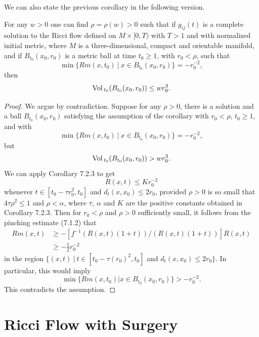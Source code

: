 We can also state the previous corollary in the following version.

\begin{corollary}
  \label{cor:cz-small-ball-pseudolocal-curvature-control}

For any $w>0$ one can find $\rho = \rho(w)>0$ such that if
$g_{ij}(t)$ is a complete solution to the Ricci flow defined on
$M\times[0,T)$ with $T>1$ and with normalized initial metric,
where $M$ is a three-dimensional, compact and orientable manifold,
and if $B_{t_0}(x_0,r_0)$ is a metric ball at time $t_0\geq1$,
with $r_0<\rho$, such that$$\min\{ Rm(x,t_0)\ |\ x\in
B_{t_0}(x_0,r_0)\}=-r_0^{-2},$$ then
$$
{\rm Vol}\,_{t_0}(B_{t_0}(x_0,r_0))\leq wr_0^3.
$$
\end{corollary}

\begin{proof}
We argue by contradiction. Suppose for any $\rho>0$, there is a
solution and a ball $B_{t_0}(x_0,r_0)$ satisfying the assumption
of the corollary with $r_0<\rho$, $t_0\geq1$, and with
$$
\min\{ Rm(x,t_0)\ |\ x\in B_{t_0}(x_0,r_0)\}=-r_0^{-2},
$$
but
$$
{\rm Vol}\,_{t_0}(B_{t_0}(x_0,r_0))>wr_0^3.
$$
We can apply Corollary 7.2.3 to get
$$
R(x,t)\leq Kr_0^{-2}
$$
whenever $t\in[t_0-\tau r_0^2,t_0]$ and $d_t(x,x_0)\leq2r_0$,
provided $\rho>0$ is so small that $4\tau\rho^2\leq1$ and
$\rho<\alpha$, where $\tau,\ \alpha$ and $K$ are the positive
constants obtained in Corollary 7.2.3. Then for $r_0<\rho$ and
$\rho>0$ sufficiently small, it follows from the pinching estimate
(7.1.2) that
\begin{displaymath}
\begin{split}
Rm(x,t)&  \geq -[f^{-1}(R(x,t)(1+t))/(R(x,t)(1+t))]R(x,t)\\[1mm]
           &  \geq-\frac{1}{2}r_0^{-2}
\end{split}
\end{displaymath}
in the region $\{(x,t)\ |\ t\in[t_0-\tau(r_0)^2,t_0]$ and
$d_t(x,x_0)\leq 2r_0\}$. In particular, this would imply
$$
\min\{ Rm(x,t_0)|x\in B_{t_0}(x_0,r_0)\}>-r_0^{-2}.
$$
This contradicts the assumption.
\end{proof}


\section{Ricci Flow with Surgery}

